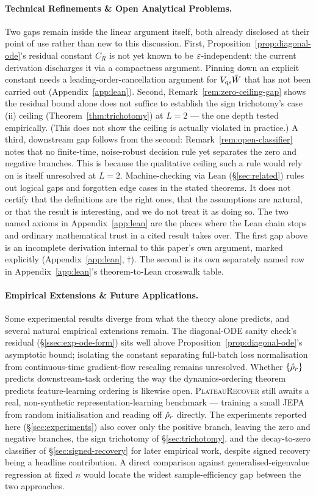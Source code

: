 \paragraph{Technical Refinements \& Open Analytical Problems.}
Two gaps remain inside the linear argument itself, both already disclosed
at their point of use rather than new to this discussion. First,
Proposition~\ref{prop:diagonal-ode}'s residual constant $C_R$ is not yet
known to be $\varepsilon$-independent: the current derivation discharges it via
a compactness argument. Pinning down an explicit constant needs a
leading-order-cancellation argument for $V_{\mathrm{qs}}\bar{W}$ that has
not been carried out (Appendix~\ref{app:lean}). Second,
Remark~\ref{rem:zero-ceiling-gap} shows the residual bound alone does not
suffice to establish the sign trichotomy's case (ii) ceiling
(Theorem~\ref{thm:trichotomy}) at $L=2$ --- the one depth tested
empirically. (This does not show the ceiling is actually violated
in practice.) A third, downstream gap follows from the second:
Remark~\ref{rem:open-classifier} notes that no finite-time, noise-robust
decision rule yet separates the zero and negative branches. This is
because the qualitative ceiling such a rule would rely on is itself
unresolved at $L=2$.
Machine-checking via Lean (\S\ref{sec:related}) rules out logical gaps and
forgotten edge cases in the stated theorems. It does not certify that
the definitions are the right ones, that the assumptions are natural, or
that the result is interesting, and we do not treat it as doing so.
The two named axioms in Appendix~\ref{app:lean} are the places where the
Lean chain stops and ordinary mathematical trust in a cited result takes
over. The first gap above is an incomplete derivation internal
to this paper's own argument, marked explicitly (Appendix~\ref{app:lean},
$\dagger$). The second is its own separately
named row in Appendix~\ref{app:lean}'s theorem-to-Lean crosswalk table. 

\paragraph{Empirical Extensions \& Future Applications.}
Some experimental results diverge from what the theory alone predicts, and several
natural empirical extensions remain. The diagonal-ODE sanity check's residual
(\S\ref{ssec:exp-ode-form}) sits well above Proposition~\ref{prop:diagonal-ode}'s
asymptotic bound; isolating the constant separating full-batch loss normalisation from
continuous-time gradient-flow rescaling remains unresolved. Whether $\{\hat{\rho}_r\}$
predicts downstream-task ordering the way the dynamics-ordering theorem predicts
feature-learning ordering is likewise open. \textsc{PlateauRecover} still awaits a real,
non-synthetic representation-learning benchmark --- training a small JEPA from random
initialisation and reading off $\hat{\rho}_r$ directly. The experiments reported here
(\S\ref{sec:experiments}) also cover only the positive branch, leaving the zero and
negative branches, the sign trichotomy of \S\ref{sec:trichotomy}, and the decay-to-zero
classifier of \S\ref{sec:signed-recovery} for later empirical work, despite signed
recovery being a headline contribution. A direct comparison against
generalised-eigenvalue regression at fixed $n$ would locate the widest
sample-efficiency gap between the two approaches.